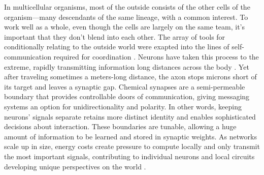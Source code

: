 \documentclass[11pt]{article}
\begin{document}
In multicellular organisms, most of the outside consists of the other cells of the organism---many descendants of the same lineage, with a common interest. To work well as a whole, even though the cells are largely on the same team, it's important that they don't blend into each other. The array of tools for conditionally relating to the outside world were exapted into the lines of self-communication required for coordination \citep{west2015major,levin2023bioelectric}. Neurons have taken this process to the extreme, rapidly transmitting information long distances across the body \citep{shepherd2003synaptic}. Yet after traveling sometimes a meters-long distance, the axon stops microns short of its target and leaves a synaptic gap. Chemical synapses are a semi-permeable boundary that provides controllable doors of communication, giving messaging systems an option for unidirectionality and polarity. In other words, keeping neurons' signals separate retains more distinct identity and enables sophisticated decisions about interaction. These boundaries are tunable, allowing a huge amount of information to be learned and stored in synaptic weights. As networks scale up in size, energy costs create pressure to compute locally and only transmit the most important signals, contributing to individual neurons and local circuits developing unique perspectives on the world \citep{herculano2010connectivity, bullmore2009complex}.






\end{document}
